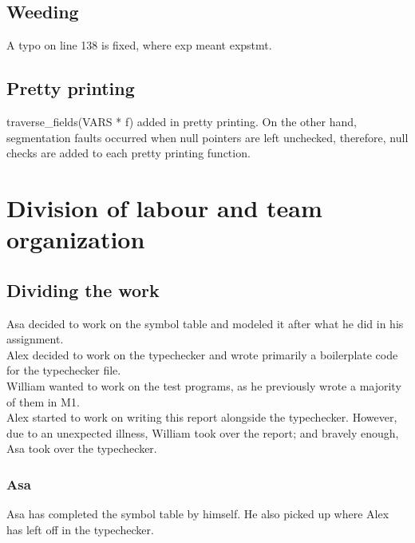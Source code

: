 \documentclass{article}
\begin{document}
\subsection{Weeding}
A typo on line 138 is fixed, where exp meant expstmt.

\subsection{Pretty printing}
traverse\_fields(VARS * f) added in pretty printing. On the other hand, segmentation faults occurred when null pointers are left unchecked, therefore, null checks are added to each pretty printing function.

\section{Division of labour and team organization}

\subsection{Dividing the work}


 Asa decided to work on the symbol table and modeled it after what he did in his assignment. \\
 Alex decided to work on the typechecker and wrote primarily a boilerplate code for the typechecker file. \\
 William wanted to work on the test programs, as he previously wrote a majority of them in M1. \\
 Alex started to work on writing this report alongside the typechecker. However, due to an unexpected illness, William took over the report; and bravely enough, Asa took over the typechecker.

\subsubsection{Asa}

Asa has completed the symbol table by himself. He also picked up where Alex has left off in the typechecker. 
\end{document}
